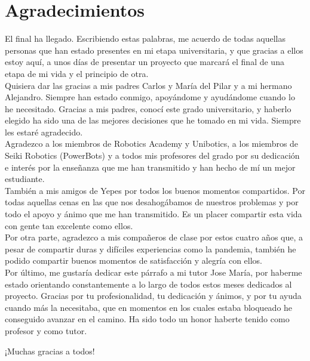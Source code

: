 \chapter*{Agradecimientos}

El final ha llegado. Escribiendo estas palabras, me acuerdo de todas aquellas personas que han estado presentes en mi etapa universitaria, y que gracias a ellos estoy aquí, a unos días de presentar un proyecto que marcará el final de una etapa de mi vida y el principio de otra.\\

Quisiera dar las gracias a mis padres Carlos y María del Pilar y a mi hermano Alejandro. Siempre han estado conmigo, apoyándome y ayudándome cuando lo he necesitado. Gracias a mis padres, conocí este grado universitario, y haberlo elegido ha sido una de las mejores decisiones que he tomado en mi vida. Siempre les estaré agradecido.\\

Agradezco a los miembros de Robotics Academy y Unibotics, a los miembros de Seiki Robotics (PowerBots) y a todos mis profesores del grado por su dedicación e interés por la enseñanza que me han transmitido y han hecho de mí un mejor estudiante.\\

También a mis amigos de Yepes por todos los buenos momentos compartidos. Por todas aquellas cenas en las que nos desahogábamos de nuestros problemas y por todo el apoyo y ánimo que me han transmitido. Es un placer compartir esta vida con gente tan excelente como ellos.\\

Por otra parte, agradezco a mis compañeros de clase por estos cuatro años que, a pesar de compartir duras y difíciles experiencias como la pandemia, también he podido compartir buenos momentos de satisfacción y alegría con ellos.\\ 

Por último, me gustaría dedicar este párrafo a mi tutor Jose María, por haberme estado orientando constantemente a lo largo de todos estos meses dedicados al proyecto. Gracias por tu profesionalidad, tu dedicación y ánimos, y por tu ayuda cuando más la necesitaba, que en momentos en los cuales estaba bloqueado he conseguido avanzar en el camino. Ha sido todo un honor haberte tenido como profesor y como tutor.\\

\begin{center}
	¡Muchas gracias a todos!
\end{center}